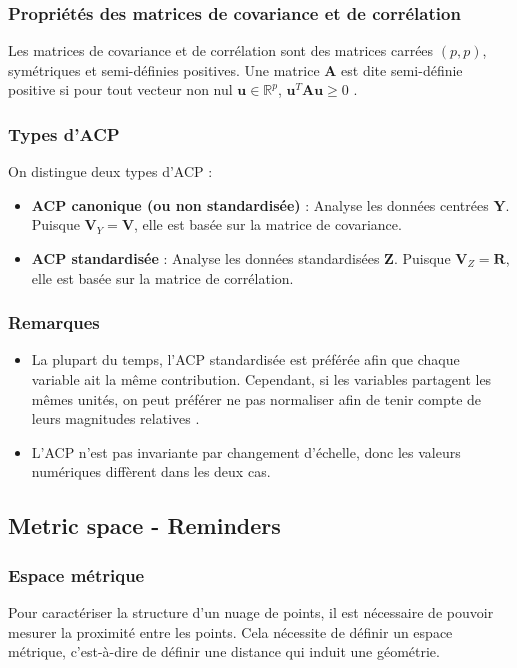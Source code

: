 \documentclass[10pt,a4paper]{article}
\begin{document}
\subsubsection*{Propriétés des matrices de covariance et de corrélation}
Les matrices de covariance et de corrélation sont des matrices carrées $(p, p)$, symétriques et semi-définies positives. Une matrice $\mathbf{A}$ est dite semi-définie positive si pour tout vecteur non nul $\mathbf{u} \in \mathbb{R}^p$, $\mathbf{u}^T \mathbf{A} \mathbf{u} \geq 0$ \cite{pmc_pca}.

\subsubsection*{Types d'ACP}
On distingue deux types d'ACP :
\begin{itemize}
    \item \textbf{ACP canonique (ou non standardisée)} : Analyse les données centrées $\mathbf{Y}$. Puisque $\mathbf{V}_Y = \mathbf{V}$, elle est basée sur la matrice de covariance.
    \item \textbf{ACP standardisée} : Analyse les données standardisées $\mathbf{Z}$. Puisque $\mathbf{V}_Z = \mathbf{R}$, elle est basée sur la matrice de corrélation.
\end{itemize}

\subsubsection*{Remarques}
\begin{itemize}
    \item La plupart du temps, l'ACP standardisée est préférée afin que chaque variable ait la même contribution. Cependant, si les variables partagent les mêmes unités, on peut préférer ne pas normaliser afin de tenir compte de leurs magnitudes relatives \cite{stat_pca}.
    \item L'ACP n'est pas invariante par changement d'échelle, donc les valeurs numériques diffèrent dans les deux cas.
\end{itemize}

\subsection*{Metric space - Reminders}
\subsubsection*{Espace métrique}
Pour caractériser la structure d'un nuage de points, il est nécessaire de pouvoir mesurer la proximité entre les points. Cela nécessite de définir un espace métrique, c'est-à-dire de définir une distance qui induit une géométrie.
\end{document}
